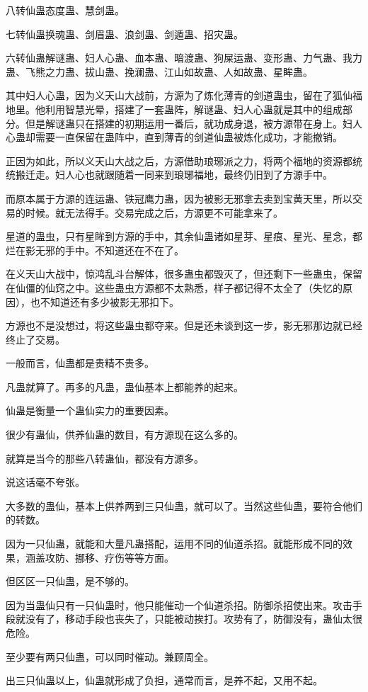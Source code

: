 \begin{this_body}
八转仙蛊态度蛊、慧剑蛊。

七转仙蛊换魂蛊、剑眉蛊、浪剑蛊、剑遁蛊、招灾蛊。

六转仙蛊解谜蛊、妇人心蛊、血本蛊、暗渡蛊、狗屎运蛊、变形蛊、力气蛊、我力蛊、飞熊之力蛊、拔山蛊、挽澜蛊、江山如故蛊、人如故蛊、星眸蛊。

其中妇人心蛊，因为义天山大战前，方源为了炼化薄青的剑道蛊虫，留在了狐仙福地里。他利用智慧光晕，搭建了一套蛊阵，解谜蛊、妇人心蛊就是其中的组成部分。但是解谜蛊只在搭建的初期运用一番后，就功成身退，被方源带在身上。妇人心蛊却需要一直保留在蛊阵中，直到薄青的剑道仙蛊被炼化成功，才能撤销。

正因为如此，所以义天山大战之后，方源借助琅琊派之力，将两个福地的资源都统统搬迁走。妇人心也就跟随着一同来到琅琊福地，最终仍旧到了方源手中。

而原本属于方源的连运蛊、铁冠鹰力蛊，因为被影无邪拿去卖到宝黄天里，所以交易的时候。就无法得手。交易完成之后，方源更不可能拿来了。

星道的蛊虫，只有星眸到方源的手中，其余仙蛊诸如星芽、星痕、星光、星念，都烂在影无邪的手中。不知道还在不在了。

在义天山大战中，惊鸿乱斗台解体，很多蛊虫都毁灭了，但还剩下一些蛊虫，保留在仙僵的仙窍之中。这些蛊虫方源都不太熟悉，样子都记得不太全了（失忆的原因），也不知道还有多少被影无邪扣下。

方源也不是没想过，将这些蛊虫都夺来。但是还未谈到这一步，影无邪那边就已经终止了交易。

一般而言，仙蛊都是贵精不贵多。

凡蛊就算了。再多的凡蛊，蛊仙基本上都能养的起来。

仙蛊是衡量一个蛊仙实力的重要因素。

很少有蛊仙，供养仙蛊的数目，有方源现在这么多的。

就算是当今的那些八转蛊仙，都没有方源多。

说这话毫不夸张。

大多数的蛊仙，基本上供养两到三只仙蛊，就可以了。当然这些仙蛊，要符合他们的转数。

因为一只仙蛊，就能和大量凡蛊搭配，运用不同的仙道杀招。就能形成不同的效果，涵盖攻防、挪移、疗伤等等方面。

但区区一只仙蛊，是不够的。

因为当蛊仙只有一只仙蛊时，他只能催动一个仙道杀招。防御杀招使出来。攻击手段就没有了，移动手段也丧失了，只能被动挨打。攻势有了，防御没有，蛊仙太很危险。

至少要有两只仙蛊，可以同时催动。兼顾周全。

出三只仙蛊以上，仙蛊就形成了负担，通常而言，是养不起，又用不起。


\end{this_body}
